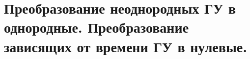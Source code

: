 \chapter{Преобразование неоднородных ГУ в однородные. Преобразование зависящих
от времени ГУ в нулевые.}

\newpage
